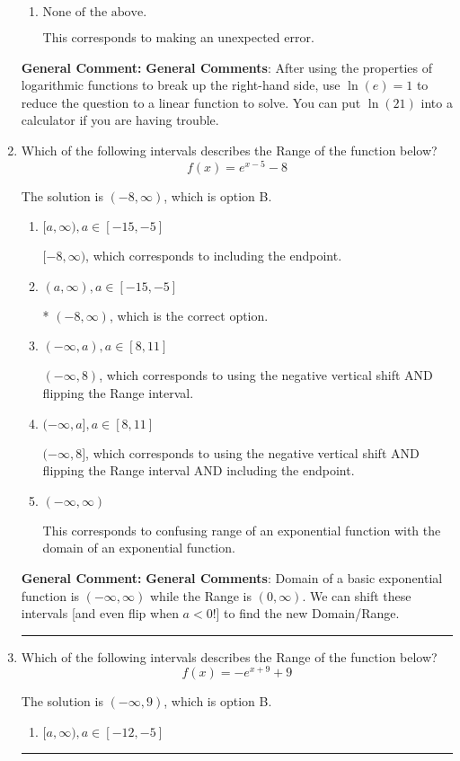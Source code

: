 \documentclass{extbook}[14pt]
\newcommand{\litem}[1]{\item #1

\rule{\textwidth}{0.4pt}}
\begin{document}
\begin{enumerate}
{\begin{enumerate}[label=\Alph*.]
This corresponds to believing you cannot solve the equation.
\item \( \text{None of the above.} \)

This corresponds to making an unexpected error.
\end{enumerate}

\textbf{General Comment:} \textbf{General Comments}: After using the properties of logarithmic functions to break up the right-hand side, use $\ln(e) = 1$ to reduce the question to a linear function to solve. You can put $\ln(21)$ into a calculator if you are having trouble.
}
\litem{
Which of the following intervals describes the Range of the function below?
\[ f(x) = e^{x-5}-8 \]

The solution is \( (-8, \infty) \), which is option B.\begin{enumerate}[label=\Alph*.]
\item \( [a, \infty), a \in [-15, -5] \)

$[-8, \infty)$, which corresponds to including the endpoint.
\item \( (a, \infty), a \in [-15, -5] \)

* $(-8, \infty)$, which is the correct option.
\item \( (-\infty, a), a \in [8, 11] \)

$(-\infty, 8)$, which corresponds to using the negative vertical shift AND flipping the Range interval.
\item \( (-\infty, a], a \in [8, 11] \)

$(-\infty, 8]$, which corresponds to using the negative vertical shift AND flipping the Range interval AND including the endpoint.
\item \( (-\infty, \infty) \)

This corresponds to confusing range of an exponential function with the domain of an exponential function.
\end{enumerate}

\textbf{General Comment:} \textbf{General Comments}: Domain of a basic exponential function is $(-\infty, \infty)$ while the Range is $(0, \infty)$. We can shift these intervals [and even flip when $a<0$!] to find the new Domain/Range.
}
\litem{
Which of the following intervals describes the Range of the function below?
\[ f(x) = -e^{x+9}+9 \]

The solution is \( (-\infty, 9) \), which is option B.\begin{enumerate}[label=\Alph*.]
\item \( [a, \infty), a \in [-12, -5] \)


\end{enumerate}}
\end{enumerate}
\end{document}
